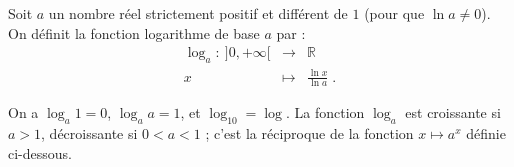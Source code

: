             \begin{defi}
                  Soit $a$ un nombre r\'eel strictement positif et diff\'erent de $1$ (pour que $\ln a \neq 0$).
                  On d\'efinit la fonction logarithme de base $a$ par :
                        \begin{equation*}
                              \begin{array}{rcl}
                                    \log_a :\ ]0,+\infty[ & \rightarrow & \mathbb{R}                        \\
                                                        x & \mapsto     & \frac{\ln x}{\ln a}               \;.
                              \end{array}
                        \end{equation*}
            \end{defi}
            On a $\log_a 1 = 0$, $\log_a a = 1$, et $\log_{10} = \log$.
            La fonction $\log_a$ est croissante si $a > 1$, d\'ecroissante si $0 < a < 1$ ; c'est la r\'eciproque de la fonction $x \mapsto a^x$ d\'efinie ci-dessous.
